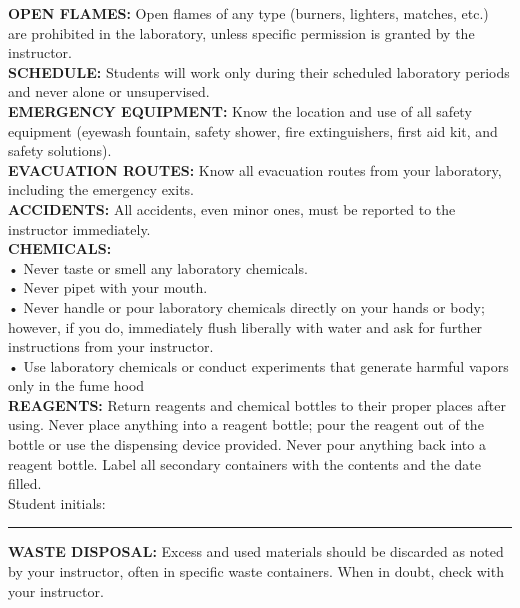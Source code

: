 \documentclass[12pt]{article}
\begin{document}
\newline %
\textbf{OPEN FLAMES:} Open flames of any type (burners, lighters, matches, etc.) are prohibited in the laboratory, unless specific permission is granted by the instructor.\\
\newline %
\textbf{ SCHEDULE:} Students will work only during their scheduled laboratory periods and never alone or unsupervised.\\
\newline %
\textbf{ EMERGENCY EQUIPMENT:} Know the location and use of all safety equipment (eyewash fountain, safety shower, fire extinguishers, first aid kit, and safety solutions).\\
\newline %
\textbf{ EVACUATION ROUTES:} Know all evacuation routes from your laboratory, including the emergency exits.\\
\newline %
\textbf{ACCIDENTS:} All accidents, even minor ones, must be reported to the instructor immediately. \\
\newline %
\textbf{CHEMICALS:}\\
\newline %
• Never taste or smell any laboratory chemicals.\\
• Never pipet with your mouth.\\
• Never handle or pour laboratory chemicals directly on your hands or body; however, if you do, immediately flush liberally with water and ask for further instructions from your instructor.\\
• Use laboratory chemicals or conduct experiments that generate harmful vapors only in the fume hood\\
\newline %
\textbf{REAGENTS:} Return reagents and chemical bottles to their proper places after using. Never place anything into a reagent bottle; pour the reagent out of the bottle or use the dispensing device provided. Never pour anything back into a reagent bottle. Label all secondary containers with the contents and the date filled. \\
\newline
\newline %
Student initials: \noindent\rule{4cm}{0.4pt}
\newpage
\noindent\textbf{ WASTE DISPOSAL: }Excess and used materials should be discarded as noted by your instructor, often in specific waste containers. When in doubt, check with your instructor.\\
\end{document}
